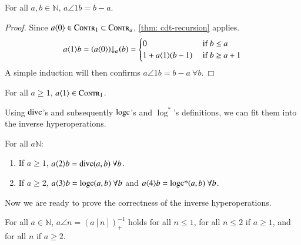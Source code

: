 \begin{lem}
For all $a, b\in \mathbb{N}$, $a\angle{1}b = b - a$.
\end{lem}
\begin{proof}
Since $a\langle 0\rangle \in \text{\scshape{Contr}}_1 \subset \text{\scshape{Contr}}_{a}$, \cref{thm: cdt-recursion} applies.
$$ a\angle{1}b = \cdt{\left(a\angle{0}\right)}{a}(b) = \begin{cases}
0 & \text{ if } b\le a \\ 1 + a\angle{1}(b - 1) & \text{ if } b\ge a+1
\end{cases} $$
A simple induction will then confirms $a\angle{1}b = b - a \ \forall b$.
\end{proof}
\begin{col} \label{col: inv-hyperop-1-contr1}
For all $a\ge 1$, $a\langle 1\rangle \in \text{\scshape{Contr}}_1$.
\end{col}
Using $\text{divc}$'s and subsequently $\text{logc}$'s and $\log^*$'s definitions, we can fit them into the inverse hyperoperations.
\begin{col} \label{col: inv-hyperop-234}
For all $a \mathbb{N}$:
\begin{enumerate}
	\item If $a\ge 1$, $a\langle 2\rangle b = \text{divc}(a, b) \ \forall b$.
	\item If $a\ge 2$, $a\langle 3\rangle b = \text{logc}(a, b) \ \forall b$ and $a\langle 4\rangle b = \text{logc*}(a, b) \ \forall b$.
\end{enumerate}
\end{col}
Now we are ready to prove the correctness of the inverse hyperoperations.
\begin{thm} \label{thm: inv-hyperop-correct}
For all $a\in \mathbb{N}$, $a\angle{n} = \left(a[n]\right)^{-1}_+$ holds for all $n\le 1$, for all $n \le 2$ if $a\ge 1$, and for all $n$ if $a\ge 2$.
\end{thm}
